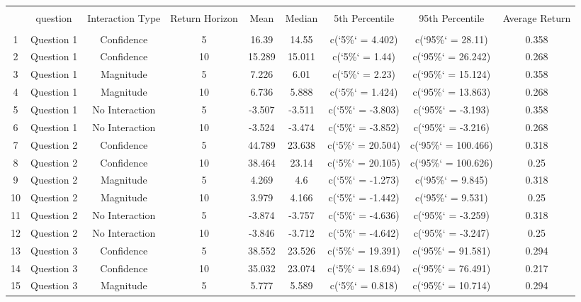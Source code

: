 
\begin{table}[!htbp] \centering 
  \caption{} 
  \label{} 
\begin{tabular}{@{\extracolsep{5pt}} ccccccccc} 
\\[-1.8ex]\hline 
\hline \\[-1.8ex] 
 & question & Interaction Type & Return Horizon & Mean & Median & 5th Percentile & 95th Percentile & Average Return \\ 
\hline \\[-1.8ex] 
1 & Question 1 & Confidence & 5 & 16.39 & 14.55 & c(`5\%` = 4.402) & c(`95\%` = 28.11) & 0.358 \\ 
2 & Question 1 & Confidence & 10 & 15.289 & 15.011 & c(`5\%` = 1.44) & c(`95\%` = 26.242) & 0.268 \\ 
3 & Question 1 & Magnitude & 5 & 7.226 & 6.01 & c(`5\%` = 2.23) & c(`95\%` = 15.124) & 0.358 \\ 
4 & Question 1 & Magnitude & 10 & 6.736 & 5.888 & c(`5\%` = 1.424) & c(`95\%` = 13.863) & 0.268 \\ 
5 & Question 1 & No Interaction & 5 & -3.507 & -3.511 & c(`5\%` = -3.803) & c(`95\%` = -3.193) & 0.358 \\ 
6 & Question 1 & No Interaction & 10 & -3.524 & -3.474 & c(`5\%` = -3.852) & c(`95\%` = -3.216) & 0.268 \\ 
7 & Question 2 & Confidence & 5 & 44.789 & 23.638 & c(`5\%` = 20.504) & c(`95\%` = 100.466) & 0.318 \\ 
8 & Question 2 & Confidence & 10 & 38.464 & 23.14 & c(`5\%` = 20.105) & c(`95\%` = 100.626) & 0.25 \\ 
9 & Question 2 & Magnitude & 5 & 4.269 & 4.6 & c(`5\%` = -1.273) & c(`95\%` = 9.845) & 0.318 \\ 
10 & Question 2 & Magnitude & 10 & 3.979 & 4.166 & c(`5\%` = -1.442) & c(`95\%` = 9.531) & 0.25 \\ 
11 & Question 2 & No Interaction & 5 & -3.874 & -3.757 & c(`5\%` = -4.636) & c(`95\%` = -3.259) & 0.318 \\ 
12 & Question 2 & No Interaction & 10 & -3.846 & -3.712 & c(`5\%` = -4.642) & c(`95\%` = -3.247) & 0.25 \\ 
13 & Question 3 & Confidence & 5 & 38.552 & 23.526 & c(`5\%` = 19.391) & c(`95\%` = 91.581) & 0.294 \\ 
14 & Question 3 & Confidence & 10 & 35.032 & 23.074 & c(`5\%` = 18.694) & c(`95\%` = 76.491) & 0.217 \\ 
15 & Question 3 & Magnitude & 5 & 5.777 & 5.589 & c(`5\%` = 0.818) & c(`95\%` = 10.714) & 0.294 \\ 

\end{tabular}
\end{table}
